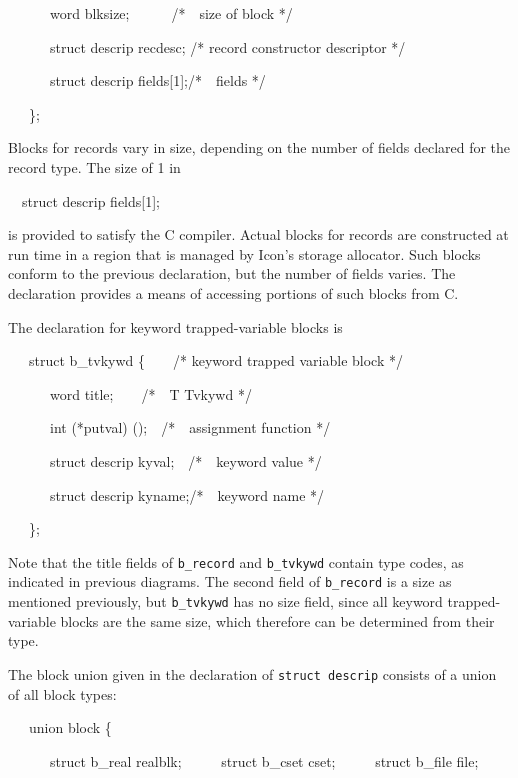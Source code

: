 {\ttfamily\mdseries
\ \ \ \ \ \ word blksize;\ \ \ \ \ \ /*\ \ size of block */}

{\ttfamily\mdseries
\ \ \ \ \ \ struct descrip recdesc; /* record constructor descriptor */}

{\ttfamily\mdseries
\ \ \ \ \ \ struct descrip fields[1];/*\ \ fields */}

{\ttfamily\mdseries
\ \ \ \};}


Blocks for records vary in size, depending on the number of fields
declared for the record type. The size of 1 in

{\ttfamily\mdseries
\ \ struct descrip fields[1];}

\noindent is provided to satisfy the C compiler. Actual blocks for
records are constructed at run time in a region that is managed by
Icon's storage allocator. Such blocks conform to the previous
declaration, but the number of fields varies. The declaration provides
a means of accessing portions of such blocks from C.

The declaration for keyword trapped-variable blocks is

{\ttfamily\mdseries
\ \ \ struct b\_tvkywd \{\ \ \ \ /* keyword trapped variable block */}

{\ttfamily\mdseries
\ \ \ \ \ \ word title;\ \ \ \ /*\ \ T Tvkywd */}

{\ttfamily\mdseries
\ \ \ \ \ \ int (*putval) ();\ \ /*\ \ assignment function */}

{\ttfamily\mdseries
\ \ \ \ \ \ struct descrip kyval;\ \ /*\ \ keyword value */}

{\ttfamily\mdseries
\ \ \ \ \ \ struct descrip kyname;/*\ \ keyword name */}

{\ttfamily\mdseries
\ \ \ \};}

Note that the title fields of \texttt{b\_record} and
\texttt{b\_tvkywd} contain type codes, as indicated in previous
diagrams. The second field of \texttt{b\_record} is a size as
mentioned previously, but \texttt{b\_tvkywd} has no size field, since
all keyword trapped-variable blocks are the same size, which therefore
can be determined from their type.

The block union given in the declaration of \texttt{struct descrip}
consists of a union of all block types:

{\ttfamily\mdseries
\ \ \ union block \{}

{\ttfamily\mdseries
\ \ \ \ \ \ struct b\_real realblk;\newline
 \ \ \ \ \ struct b\_cset cset;\newline
 \ \ \ \ \ struct b\_file file;}

